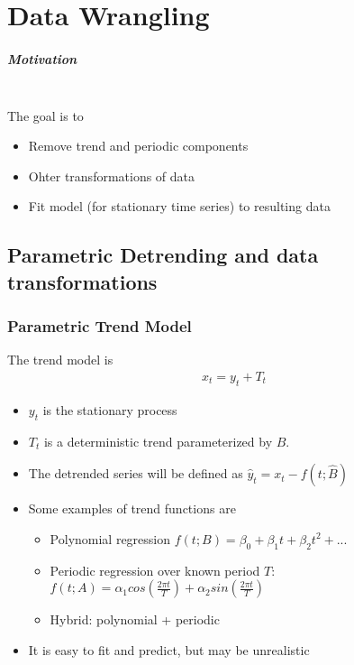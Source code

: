 \chapter{Data Wrangling}

\paragraph{Motivation} \mbox{}\\
The goal is to 
    \begin{itemize}
        \item Remove trend and periodic components
        \item Ohter transformations of data
        \item Fit model (for stationary time series) to resulting data 
    \end{itemize}

\section{Parametric Detrending and data transformations} 

\subsection{Parametric Trend Model}
The trend model is
    \begin{align*}
        x_t = y_t + T_t
    \end{align*}
    \begin{itemize}
        \item $y_t$ is the stationary process
        \item $T_t$ is a deterministic trend parameterized by $B$. 
        \item The detrended series will be defined as $\hat{y}_t = x_t - f(t; \hat{B})$
        \item Some examples of trend functions are 
            \begin{itemize}
                \item Polynomial regression $f(t;B) = \beta_0 + \beta_1 t + \beta_2 t^2 + ...$
                \item Periodic regression over known period $T$:  $f(t;A) = \alpha_1 cos(\frac{2\pi t}{T}) + \alpha_2 sin(\frac{2\pi t}{T})$
                \item Hybrid: polynomial + periodic 
            \end{itemize}
        \item It is easy to fit and predict, but may be unrealistic
    \end{itemize}

